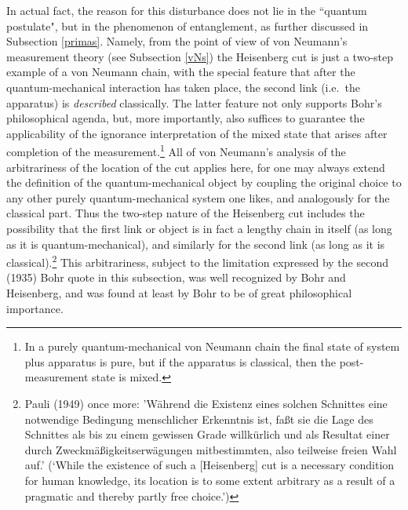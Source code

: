 \documentclass[12pt,titlepage]{article}
\begin{document}
In actual fact, the reason for this disturbance does not lie in the    ``quantum postulate",  but in the phenomenon of entanglement, as further discussed in Subsection  \ref{primas}.
Namely, from the point of view of von Neumann's measurement theory (see Subsection \ref{vNs})
 the Heisenberg cut is just a two-step example of a von Neumann chain, with the special feature that after the quantum-mechanical interaction has taken place, the second link (i.e.\ the apparatus) is {\it described} classically.
The latter feature not only supports  Bohr's philosophical agenda, but, more importantly,
also suffices to guarantee the applicability of the ignorance interpretation of the mixed state that arises after completion of the measurement.\footnote{In a purely quantum-mechanical von Neumann chain the final state of system plus apparatus is pure, but if the
apparatus  is classical, then  the post-measurement state is mixed.} 
 All of von Neumann's analysis of the arbitrariness of the location of the cut applies here, for  one may always extend the definition of the quantum-mechanical object by coupling the original choice to any other purely quantum-mechanical system one likes, and analogously for the classical part. Thus the two-step nature of the Heisenberg cut includes the possibility that the first link or object is in fact a lengthy chain in itself (as long as it is quantum-mechanical), and similarly for the second link (as long as it is classical).\footnote{\label{PFN2} Pauli (1949) once more: 'W\"{a}hrend die {\sc Existenz} eines solchen Schnittes eine notwendige Bedingung menschlicher Erkenntnis ist, fa\ss t sie die {\sc Lage} des Schnittes als bis zu einem gewissen Grade willk\"{u}rlich und als Resultat einer durch Zweckm\"{a}\ss igkeitserw\"{a}gungen mitbestimmten, also teilweise freien Wahl auf.'
(`While the {\sc existence} of such a [Heisenberg] cut is a necessary condition for human knowledge,
its {\sc location} is to some extent arbitrary as a result of a pragmatic and thereby partly 
free choice.')} This arbitrariness, subject to the limitation expressed by the second (1935) Bohr quote in this subsection, was well recognized by Bohr and Heisenberg, and was found at least by Bohr to be of great philosophical importance. 
\end{document}
